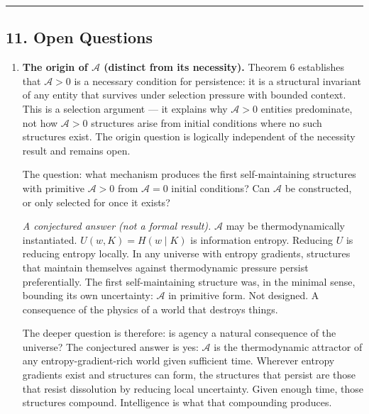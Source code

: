 \documentclass[
]{article}
\begin{document}
\begin{center}\rule{0.5\linewidth}{0.5pt}\end{center}

\subsection{11. Open Questions}\label{open-questions}

\begin{enumerate}
\def\labelenumi{\arabic{enumi}.}
\item
  \textbf{The origin of \(\mathcal{A}\) (distinct from its necessity).}
  Theorem 6 establishes that \(\mathcal{A} > 0\) is a necessary
  condition for persistence: it is a structural invariant of any entity
  that survives under selection pressure with bounded context. This is a
  selection argument --- it explains why \(\mathcal{A} > 0\) entities
  predominate, not how \(\mathcal{A} > 0\) structures arise from initial
  conditions where no such structures exist. The origin question is
  logically independent of the necessity result and remains open.

  The question: what mechanism produces the first self-maintaining
  structures with primitive \(\mathcal{A} > 0\) from \(\mathcal{A} = 0\)
  initial conditions? Can \(\mathcal{A}\) be constructed, or only
  selected for once it exists?

  \emph{A conjectured answer (not a formal result).} \(\mathcal{A}\) may
  be thermodynamically instantiated. \(U(w, K) = H(w \mid K)\) is
  information entropy. Reducing \(U\) is reducing entropy locally. In
  any universe with entropy gradients, structures that maintain
  themselves against thermodynamic pressure persist preferentially. The
  first self-maintaining structure was, in the minimal sense, bounding
  its own uncertainty: \(\mathcal{A}\) in primitive form. Not designed.
  A consequence of the physics of a world that destroys things.

  The deeper question is therefore: is agency a natural consequence of
  the universe? The conjectured answer is yes: \(\mathcal{A}\) is the
  thermodynamic attractor of any entropy-gradient-rich world given
  sufficient time. Wherever entropy gradients exist and structures can
  form, the structures that persist are those that resist dissolution by
  reducing local uncertainty. Given enough time, those structures
  compound. Intelligence is what that compounding produces.


\end{enumerate}
\end{document}
